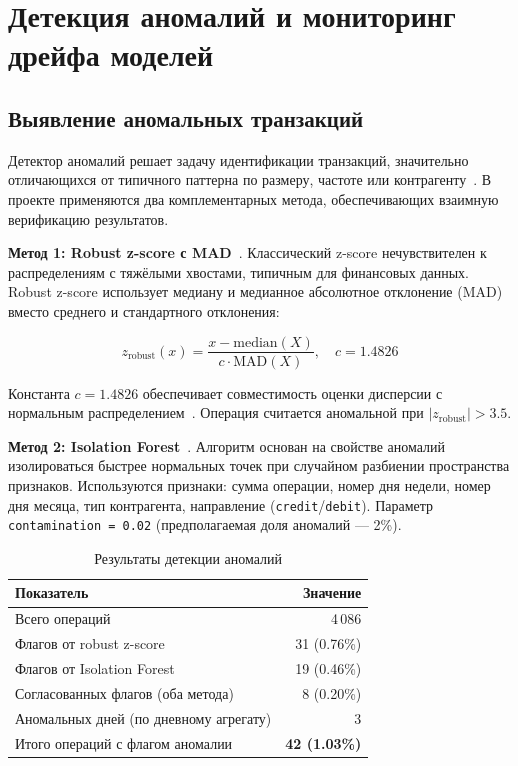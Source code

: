 \section{Детекция аномалий и мониторинг дрейфа моделей}

\subsection{Выявление аномальных транзакций}

Детектор аномалий решает задачу идентификации транзакций, значительно отличающихся от типичного паттерна по размеру, частоте или контрагенту~\cite{chandola2009anomaly}. В проекте применяются два комплементарных метода, обеспечивающих взаимную верификацию результатов.

\textbf{Метод 1: Robust z-score с MAD}~\cite{rousseeuw1993alternatives}. Классический z-score нечувствителен к распределениям с тяжёлыми хвостами, типичным для финансовых данных. Robust z-score использует медиану и медианное абсолютное отклонение (MAD) вместо среднего и стандартного отклонения:

\begin{equation}
z_\text{robust}(x) = \frac{x - \text{median}(X)}{c \cdot \text{MAD}(X)}, \quad c = 1.4826
\end{equation}

Константа $c = 1.4826$ обеспечивает совместимость оценки дисперсии с нормальным распределением~\cite{rousseeuw1993alternatives}. Операция считается аномальной при $|z_\text{robust}| > 3.5$.

\textbf{Метод 2: Isolation Forest}~\cite{liu2008isolation}. Алгоритм основан на свойстве аномалий изолироваться быстрее нормальных точек при случайном разбиении пространства признаков. Используются признаки: сумма операции, номер дня недели, номер дня месяца, тип контрагента, направление (\texttt{credit}/\texttt{debit}). Параметр \texttt{contamination = 0.02} (предполагаемая доля аномалий --- 2\%).

\begin{table}[H]
\centering
\caption{Результаты детекции аномалий}
\label{tab:anomaly_results}
\begin{tabular}{lr}
\toprule
\textbf{Показатель} & \textbf{Значение} \\
\midrule
Всего операций & 4\,086 \\
Флагов от robust z-score & 31 (0.76\%) \\
Флагов от Isolation Forest & 19 (0.46\%) \\
Согласованных флагов (оба метода) & 8 (0.20\%) \\
Аномальных дней (по дневному агрегату) & 3 \\
Итого операций с флагом аномалии & \textbf{42 (1.03\%)} \\
\bottomrule
\end{tabular}
\end{table}

